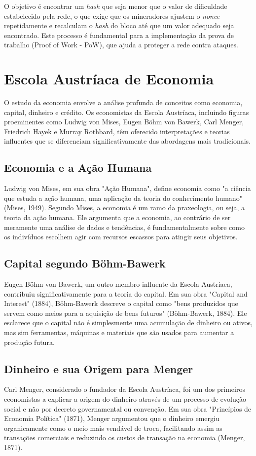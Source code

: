 O objetivo é encontrar um \textit{hash} que seja menor que o valor de dificuldade estabelecido pela rede, o que exige que os mineradores ajustem o \textit{nonce} repetidamente e recalculam o \textit{hash} do bloco até que um valor adequado seja encontrado. Este processo é fundamental para a implementação da prova de trabalho (Proof of Work - PoW), que ajuda a proteger a rede contra ataques.

\clearpage
\section{Escola Austríaca de Economia} \label{sec:austiaca}
O estudo da economia envolve a análise profunda de conceitos como economia, capital, dinheiro e crédito. Os economistas da Escola Austríaca, incluindo figuras proeminentes como Ludwig von Mises, Eugen Böhm von Bawerk, Carl Menger, Friedrich Hayek e Murray Rothbard, têm oferecido interpretações e teorias influentes que se diferenciam significativamente das abordagens mais tradicionais. 

\subsection{Economia e a Ação Humana}
Ludwig von Mises, em sua obra "Ação Humana", define economia como "a ciência que estuda a ação humana, uma aplicação da teoria do conhecimento humano" (Mises, 1949). Segundo Mises, a economia é um ramo da praxeologia, ou seja, a teoria da ação humana. Ele argumenta que a economia, ao contrário de ser meramente uma análise de dados e tendências, é fundamentalmente sobre como os indivíduos escolhem agir com recursos escassos para atingir seus objetivos.

\subsection{Capital segundo Böhm-Bawerk}
Eugen Böhm von Bawerk, um outro membro influente da Escola Austríaca, contribuiu significativamente para a teoria do capital. Em sua obra "Capital and Interest" (1884), Böhm-Bawerk descreve o capital como "bens produzidos que servem como meios para a aquisição de bens futuros" (Böhm-Bawerk, 1884). Ele esclarece que o capital não é simplesmente uma acumulação de dinheiro ou ativos, mas sim ferramentas, máquinas e materiais que são usados para aumentar a produção futura.

\subsection{Dinheiro e sua Origem para Menger}
Carl Menger, considerado o fundador da Escola Austríaca, foi um dos primeiros economistas a explicar a origem do dinheiro através de um processo de evolução social e não por decreto governamental ou convenção. Em sua obra "Princípios de Economia Política" (1871), Menger argumentou que o dinheiro emergiu organicamente como o meio mais vendável de troca, facilitando assim as transações comerciais e reduzindo os custos de transação na economia (Menger, 1871).

